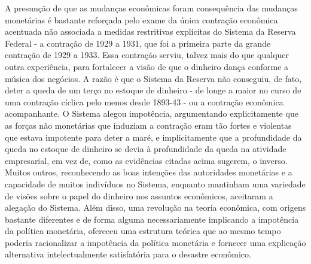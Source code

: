\documentclass[12pt]{article}
\begin{document}
A presunção de que as mudanças econômicas foram consequência das mudanças monetárias é bastante reforçada pelo exame da única contração econômica acentuada não associada a medidas restritivas explícitas do Sistema da Reserva Federal - a contração de 1929 a 1931, que foi a primeira parte da grande contração de 1929 a 1933. Essa contração serviu, talvez mais do que qualquer outra experiência, para fortalecer a visão de que o dinheiro dança conforme a música dos negócios. A razão é que o Sistema da Reserva não conseguiu, de fato, deter a queda de um terço no estoque de dinheiro - de longe a maior no curso de uma contração cíclica pelo menos desde 1893-43 - ou a contração econômica acompanhante. O Sistema alegou impotência, argumentando explicitamente que as forças não monetárias que induziam a contração eram tão fortes e violentas que estava impotente para deter a maré, e implicitamente que a profundidade da queda no estoque de dinheiro se devia à profundidade da queda na atividade empresarial, em vez de, como as evidências citadas acima sugerem, o inverso. Muitos outros, reconhecendo as boas intenções das autoridades monetárias e a capacidade de muitos indivíduos no Sistema, enquanto mantinham uma variedade de visões sobre o papel do dinheiro nos assuntos econômicos, aceitaram a alegação do Sistema. Além disso, uma revolução na teoria econômica, com origens bastante diferentes e de forma alguma necessariamente implicando a impotência da política monetária, ofereceu uma estrutura teórica que ao mesmo tempo poderia racionalizar a impotência da política monetária e fornecer uma explicação alternativa intelectualmente satisfatória para o desastre econômico.
\end{document}
